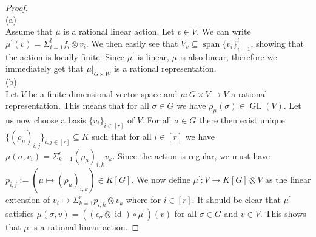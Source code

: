\begin{proof}\hfill\\
  \underline{(a)}\\
  Assume that $\mu$ is a rational linear action.
  Let $v \in V$.
  We can write $\mu^\prime (v) = \Sigma_{i=1}^l f_i \otimes v_i$. %
  We then easily see that $V_v \subseteq \operatorname{span}\{v_i\}_{i=1}^l$, showing that the action is locally finite.
  Since $\mu^\prime$ is linear, $\mu$ is also linear, therefore we immediately get that $\left. \mu \right|_{G\times W}$ is a rational representation.\\
  \underline{(b)}\\
  Let $V$ be a finite-dimensional vector-space and $\mu \colon G \times V \rightarrow V$ a rational representation.
  This means that for all $\sigma \in G$ we have $\rho_\mu (\sigma) \in \operatorname{GL}(V)$.
  Let us now choose a basis $\{v_i\}_{i \in [r]}$ of $V$.
  For all $\sigma \in G$ there then exist unique $\{ \left( \rho_\mu \right)_{i,j}\}_{i,j \in [r]} \subseteq K$ such that for all $i \in [r]$ we have $\mu (\sigma,v_i) = \Sigma_{k=1}^r \left(\rho_\mu\right)_{i,k} v_k$.
  Since the action is regular, we must have $p_{i,j} := ( \mu \mapsto (\rho_\mu)_{i,k}) \in K[G]$.
  We now define $\mu^\prime \colon V \rightarrow K[G] \otimes V$ as the linear extension of $v_i \mapsto \Sigma_{k=1}^r p_{i,k} \otimes v_k$ where for $i \in [r]$.
  It should be clear that $\mu^\prime$ satisfies $ \mu \left( \sigma , v \right) = \left( \left( \epsilon_\sigma \otimes \operatorname{id} \right) \circ \mu^\prime \right) \left(v\right) $ for all $\sigma \in G$ and $v \in V$.
  This shows that $\mu$ is a rational linear action.
  \end{proof}

